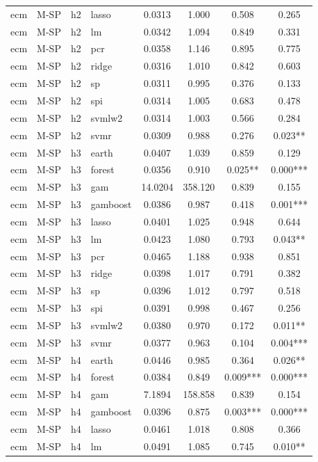 \begin{ThreePartTable}
\begin{longtable}[t]{llclcccc}
ecm & M-SP & h2 & lasso & 0.0313 & 1.000 & 0.508 & 0.265\\
ecm & M-SP & h2 & lm & 0.0342 & 1.094 & 0.849 & 0.331\\
ecm & M-SP & h2 & pcr & 0.0358 & 1.146 & 0.895 & 0.775\\
ecm & M-SP & h2 & ridge & 0.0316 & 1.010 & 0.842 & 0.603\\
ecm & M-SP & h2 & sp & 0.0311 & 0.995 & 0.376 & 0.133\\
ecm & M-SP & h2 & spi & 0.0314 & 1.005 & 0.683 & 0.478\\
ecm & M-SP & h2 & svmlw2 & 0.0314 & 1.003 & 0.566 & 0.284\\
ecm & M-SP & h2 & svmr & 0.0309 & 0.988 & 0.276 & 0.023**\\
\addlinespace
ecm & M-SP & h3 & earth & 0.0407 & 1.039 & 0.859 & 0.129\\
ecm & M-SP & h3 & forest & 0.0356 & 0.910 & 0.025** & 0.000***\\
ecm & M-SP & h3 & gam & 14.0204 & 358.120 & 0.839 & 0.155\\
ecm & M-SP & h3 & gamboost & 0.0386 & 0.987 & 0.418 & 0.001***\\
ecm & M-SP & h3 & lasso & 0.0401 & 1.025 & 0.948 & 0.644\\
ecm & M-SP & h3 & lm & 0.0423 & 1.080 & 0.793 & 0.043**\\
ecm & M-SP & h3 & pcr & 0.0465 & 1.188 & 0.938 & 0.851\\
ecm & M-SP & h3 & ridge & 0.0398 & 1.017 & 0.791 & 0.382\\
ecm & M-SP & h3 & sp & 0.0396 & 1.012 & 0.797 & 0.518\\
ecm & M-SP & h3 & spi & 0.0391 & 0.998 & 0.467 & 0.256\\
ecm & M-SP & h3 & svmlw2 & 0.0380 & 0.970 & 0.172 & 0.011**\\
ecm & M-SP & h3 & svmr & 0.0377 & 0.963 & 0.104 & 0.004***\\
\addlinespace
ecm & M-SP & h4 & earth & 0.0446 & 0.985 & 0.364 & 0.026**\\
ecm & M-SP & h4 & forest & 0.0384 & 0.849 & 0.009*** & 0.000***\\
ecm & M-SP & h4 & gam & 7.1894 & 158.858 & 0.839 & 0.154\\
ecm & M-SP & h4 & gamboost & 0.0396 & 0.875 & 0.003*** & 0.000***\\
ecm & M-SP & h4 & lasso & 0.0461 & 1.018 & 0.808 & 0.366\\
ecm & M-SP & h4 & lm & 0.0491 & 1.085 & 0.745 & 0.010**\\

\end{longtable}
\end{ThreePartTable}
